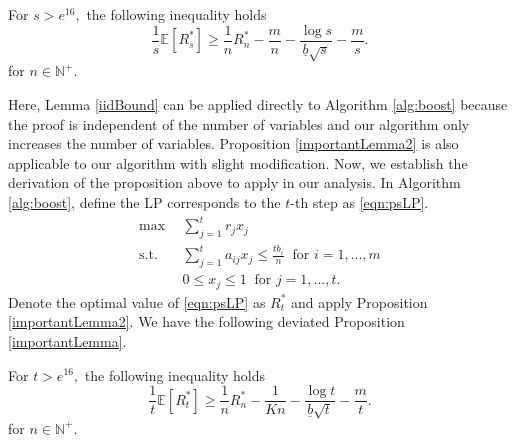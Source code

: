 \documentclass{article} %
\begin{document}
\begin{APPENDICES}
        
        \begin{proposition}
        For $s>e^{16},$ the following inequality holds 
            \begin{equation*}
                \frac{1}{s}\mathbb{E} \left[R_{s}^*\right]
            \geq
            \frac{1}{n} R_n^*
            -
            \frac{m }{n}-\frac{ \log s}{\underline{b}\sqrt{s}}
            -
            \frac{m }{s}.
            \end{equation*}
            for $n\in\mathbb{N}^+$.
            \label{importantLemma2}
        \end{proposition}
        
        
      Here, Lemma \ref{iidBound} can be applied directly to Algorithm \ref{alg:boost} because the proof is independent of the number of variables and our algorithm only increases the number of variables. Proposition \ref{importantLemma2} is also applicable to our algorithm with slight modification. Now, we establish the derivation of the proposition above to apply in our analysis. In Algorithm \ref{alg:boost}, define the LP corresponds to the $t$-th step as \eqref{eqn:psLP}.
        \begin{align} \label{eqn:psLP}
              \tag{p-sLP}  \max \ \ & \sum_{j=1}^{t} r_jx_{j}   \\
                \text{s.t. }\ & \sum_{j=1}^{t} a_{ij}x_{j} \leq\frac{tb_i}{n} \ \text{ for } i=1,...,m\nonumber\\
                & 0 \le x_{j} \le 1\ \text{ for } j=1,...,t.\nonumber
        \end{align}
        Denote the optimal value of \eqref{eqn:psLP} as $R^*_{t}$ and apply Proposition \ref{importantLemma2}. We have the following deviated Proposition \ref{importantLemma}.
        
        \begin{proposition}
        \label{importantLemma}
            For $t>e^{16},$ the following inequality holds 
                \begin{equation}\label{R_k_R_n}
                    \frac{1}{t}\mathbb{E} \left[R_{t}^*\right]
                \geq
                \frac{1}{n} R_n^*
                -
                \frac{1}{Kn}
                -
                \frac{\log t}{\underline{b}\sqrt{t}}
                -
                \frac{m}{t}.
                \end{equation}
                for $n\in\mathbb{N}^+$.
        \end{proposition}
        

\end{APPENDICES}
\end{document}
